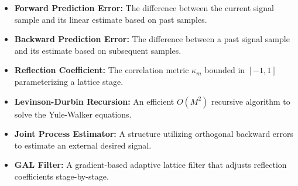 \documentclass[12pt,a4paper]{article}
\begin{document}
\begin{tcolorbox}[defbox, title={\textbf{One-Line Definitions}}]
\begin{itemize}[leftmargin=*, itemsep=2.5pt, topsep=0pt]
  \item \textbf{Forward Prediction Error:} The difference between the current signal sample and its linear estimate based on past samples.
  \item \textbf{Backward Prediction Error:} The difference between a past signal sample and its estimate based on subsequent samples.
  \item \textbf{Reflection Coefficient:} The correlation metric $\kappa_m$ bounded in $[-1, 1]$ parameterizing a lattice stage.
  \item \textbf{Levinson-Durbin Recursion:} An efficient $O(M^2)$ recursive algorithm to solve the Yule-Walker equations.
  \item \textbf{Joint Process Estimator:} A structure utilizing orthogonal backward errors to estimate an external desired signal.
  \item \textbf{GAL Filter:} A gradient-based adaptive lattice filter that adjusts reflection coefficients stage-by-stage.
\end{itemize}
\end{tcolorbox}
\end{document}
